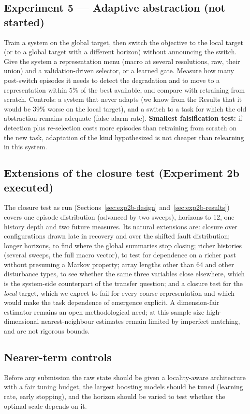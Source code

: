 \documentclass[11pt,a4paper]{article}
\begin{document}
\subsection{Experiment 5 --- Adaptive abstraction (not started)}
Train a system on the global target, then switch the objective to the local
target (or to a global target with a different horizon) without announcing the
switch. Give the system a representation menu (macro at several resolutions,
raw, their union) and a validation-driven selector, or a learned gate. Measure
how many post-switch episodes it needs to detect the degradation and to move to
a representation within 5\% of the best available, and compare with retraining
from scratch. Controls: a system that never adapts (we know from the Results
that it would be 39\% worse on the local target), and a switch to a task for
which the old abstraction remains adequate (false-alarm rate).
\textbf{Smallest falsification test:} if detection plus re-selection costs more
episodes than retraining from scratch on the new task, adaptation of the kind
hypothesized is not cheaper than relearning in this system.

\subsection{Extensions of the closure test (Experiment 2b executed)}\label{sec:exp2b}
The closure test as run (Sections~\ref{sec:exp2b-design}
and~\ref{sec:exp2b-results}) covers one episode distribution (advanced by two
sweeps), horizons to 12, one history depth and two future measures. Its
natural extensions are: closure over configurations drawn late in recovery
and over the shifted fault distribution; longer horizons, to find where the
global summaries stop closing; richer histories (several sweeps, the full
macro vector), to test for dependence on a richer past without presuming a Markov property; array lengths
other than 64 and other disturbance types, to see whether the same three
variables close elsewhere, which is the system-side counterpart of the
transfer question; and a closure test for the \emph{local} target, which we
expect to fail for every coarse representation and which would make the task
dependence of emergence explicit. A dimension-fair estimator remains an open
methodological need; at this sample size high-dimensional nearest-neighbour estimates remain
limited by imperfect matching, and are not rigorous bounds.

\subsection{Nearer-term controls}
Before any submission the raw state should be given a locality-aware
architecture with a fair tuning budget, the largest boosting models should be
tuned (learning rate, early stopping), and the horizon should be varied to test
whether the optimal scale depends on it.
\end{document}
